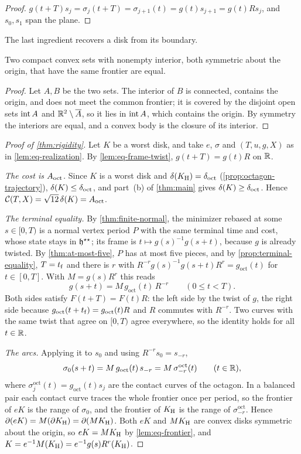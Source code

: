 \begin{proof}
$g(t+T)s_j=\sigma_j(t+T)=\sigma_{j+1}(t)=g(t)s_{j+1}=g(t)Rs_j$, and $s_0,s_1$ span the plane.
\end{proof}

The last ingredient recovers a disk from its boundary.

\begin{lemma}\label{lem:eq-frontier}
Two compact convex sets with nonempty interior, both symmetric about the origin, that have the
same frontier are equal.
\end{lemma}

\begin{proof}
Let $A,B$ be the two sets. The interior of $B$ is connected, contains the origin, and does not
meet the common frontier; it is covered by the disjoint open sets $\operatorname{int} A$ and
$\mathbb{R}^2\setminus\overline A$, so it lies in $\operatorname{int} A$, which contains the origin. By symmetry the
interiors are equal, and a convex body is the closure of its interior.
\end{proof}

\begin{proof}[Proof of \cref{thm:rigidity}]
Let $K$ be a worst disk, and take $e$, $\sigma$ and $(T,u,g,X)$ as in \cref{lem:eq-realization}.
By \cref{lem:eq-frame-twist}, $g(t+T)=g(t)R$ on $\mathbb{R}$.

\emph{The cost is $A_{\mathrm{oct}}$.} Since $K$ is a worst disk and $\delta(K_{\mathrm{H}})=\delta_{\mathrm{oct}}$
(\cref{prop:octagon-trajectory}), $\delta(K)\le\delta_{\mathrm{oct}}$, and part~(b) of \cref{thm:main} gives
$\delta(K)\ge\delta_{\mathrm{oct}}$. Hence $\mathcal{C}(T,X)=\sqrt{12}\,\delta(K)=A_{\mathrm{oct}}$.

\emph{The terminal equality.} By \cref{thm:finite-normal}, the minimizer rebased at some
$s\in[0,T)$ is a normal vertex period $P$ with the same terminal time and cost, whose state stays
in $\mathfrak{h}^{\star\star}$; its frame is $t\mapsto g(s)^{-1}g(s+t)$, because $g$ is already twisted. By
\cref{thm:at-most-five}, $P$ has at most five pieces, and by \cref{prop:terminal-equality},
$T=t_{\mathrm{f}}$ and there is $r$ with $R^{-r}g(s)^{-1}g(s+t)R^{r}=g_{\mathrm{oct}}(t)$ for $t\in[0,T]$.
With $M=g(s)R^r$ this reads
\[
 g(s+t)=M\,g_{\mathrm{oct}}(t)\,R^{-r}\qquad(0\le t<T).
\]
Both sides satisfy $F(t+T)=F(t)R$: the left side by the twist of $g$, the right side because
$g_{\mathrm{oct}}(t+t_{\mathrm{f}})=g_{\mathrm{oct}}(t)R$ and $R$ commutes with $R^{-r}$. Two curves with the
same twist that agree on $[0,T)$ agree everywhere, so the identity holds for all $t\in\mathbb{R}$.

\emph{The arcs.} Applying it to $s_0$ and using $R^{-r}s_0=s_{-r}$,
\[
 \sigma_0(s+t)=M\,g_{\mathrm{oct}}(t)\,s_{-r}=M\,\sigma^{\mathrm{oct}}_{-r}(t)\qquad(t\in\mathbb{R}),
\]
where $\sigma^{\mathrm{oct}}_j(t)=g_{\mathrm{oct}}(t)s_j$ are the contact curves of the octagon.
In a balanced pair each contact curve traces the whole frontier once per period, so the frontier
of $eK$ is the range of $\sigma_0$, and the frontier of $K_{\mathrm{H}}$ is the range of
$\sigma^{\mathrm{oct}}_{-r}$. Hence $\partial(eK)=M(\partial K_{\mathrm{H}})=\partial(MK_{\mathrm{H}})$. Both $eK$ and
$MK_{\mathrm{H}}$ are convex disks symmetric about the origin, so $eK=MK_{\mathrm{H}}$ by \cref{lem:eq-frontier}, and
$K=e^{-1}M(K_{\mathrm{H}})=e^{-1}g(s)R^r(K_{\mathrm{H}})$.
\end{proof}


